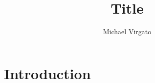 \documentclass{article}
\title{Title}
\author{Michael Virgato}
\date{}
\begin{document}
\maketitle

\section{Introduction}

\end{document}

